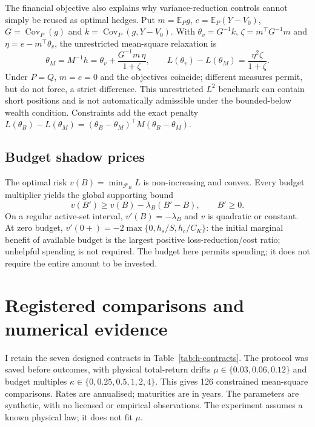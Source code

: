 \documentclass[11pt]{article}
\begin{document}
The financial objective also explains why variance-reduction controls
cannot simply be reused as optimal hedges. Put $m=\mathbb E_Pg$,
$e=\mathbb E_P(Y-V_0)$, $G=\operatorname{Cov}_P(g)$ and
$k=\operatorname{Cov}_P(g,Y-V_0)$. With
$\theta_v=G^{-1}k$, $\zeta=m^\top G^{-1}m$ and
$\eta=e-m^\top\theta_v$, the unrestricted mean-square relaxation is
\begin{equation}
 \theta_M=M^{-1}h=\theta_v+\frac{G^{-1}m\,\eta}{1+\zeta},
 \qquad L(\theta_v)-L(\theta_M)=\frac{\eta^2\zeta}{1+\zeta}.
 \label{eq:h-centred-risk-gap}
\end{equation}
Under $P=Q$, $m=e=0$ and the objectives coincide; different measures
permit, but do not force, a strict difference. This unrestricted
$L^2$ benchmark can contain short positions and is not automatically
admissible under the bounded-below wealth condition. Constraints add the
exact penalty
$L(\theta_B)-L(\theta_M)=(\theta_B-\theta_M)^\top
M(\theta_B-\theta_M)$.

\subsection{Budget shadow prices}

The optimal risk $v(B)=\min_{\mathcal F_B}L$ is non-increasing
and convex. Every budget multiplier yields the global supporting bound
\begin{equation}
 v(B')\geq v(B)-\lambda_B(B'-B),\qquad B'\geq0.
 \label{eq:h-budget-shadow}
\end{equation}
On a regular active-set interval, $v'(B)=-\lambda_B$ and $v$ is
quadratic or constant. At zero budget,
$v'(0+)=-2\max\{0,h_s/S,h_c/C_K\}$: the initial marginal
benefit of available budget is the largest positive loss-reduction/cost
ratio; unhelpful spending is not required. The budget here permits spending; it does not require the entire
amount to be invested.
\section{Registered comparisons and numerical evidence}
\label{sec:h-results}

I retain the seven designed contracts in Table~\ref{tab:h-contracts}.
The protocol was saved before outcomes, with physical total-return drifts
$\mu\in\{0.03,0.06,0.12\}$ and budget multiples
$\kappa\in\{0,0.25,0.5,1,2,4\}$. This gives 126 constrained
mean-square comparisons. Rates are annualised; maturities are in years.
The parameters are synthetic, with no licensed or empirical observations.
The experiment assumes a known physical law; it does not fit $\mu$.
\end{document}
